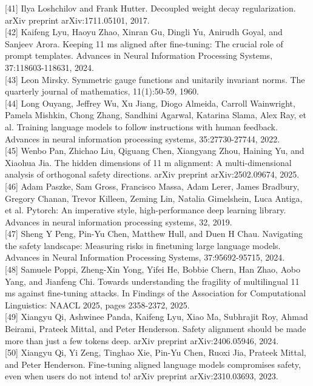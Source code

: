 \documentclass[10pt]{article}
\begin{document}
[41] Ilya Loshchilov and Frank Hutter. Decoupled weight decay regularization. arXiv preprint arXiv:1711.05101, 2017.\\[0pt]
[42] Kaifeng Lyu, Haoyu Zhao, Xinran Gu, Dingli Yu, Anirudh Goyal, and Sanjeev Arora. Keeping 11 ms aligned after fine-tuning: The crucial role of prompt templates. Advances in Neural Information Processing Systems, 37:118603-118631, 2024.\\[0pt]
[43] Leon Mirsky. Symmetric gauge functions and unitarily invariant norms. The quarterly journal of mathematics, 11(1):50-59, 1960.\\[0pt]
[44] Long Ouyang, Jeffrey Wu, Xu Jiang, Diogo Almeida, Carroll Wainwright, Pamela Mishkin, Chong Zhang, Sandhini Agarwal, Katarina Slama, Alex Ray, et al. Training language models to follow instructions with human feedback. Advances in neural information processing systems, 35:27730-27744, 2022.\\[0pt]
[45] Wenbo Pan, Zhichao Liu, Qiguang Chen, Xiangyang Zhou, Haining Yu, and Xiaohua Jia. The hidden dimensions of 11 m alignment: A multi-dimensional analysis of orthogonal safety directions. arXiv preprint arXiv:2502.09674, 2025.\\[0pt]
[46] Adam Paszke, Sam Gross, Francisco Massa, Adam Lerer, James Bradbury, Gregory Chanan, Trevor Killeen, Zeming Lin, Natalia Gimelshein, Luca Antiga, et al. Pytorch: An imperative style, high-performance deep learning library. Advances in neural information processing systems, 32, 2019.\\[0pt]
[47] Sheng Y Peng, Pin-Yu Chen, Matthew Hull, and Duen H Chau. Navigating the safety landscape: Measuring risks in finetuning large language models. Advances in Neural Information Processing Systems, 37:95692-95715, 2024.\\[0pt]
[48] Samuele Poppi, Zheng-Xin Yong, Yifei He, Bobbie Chern, Han Zhao, Aobo Yang, and Jianfeng Chi. Towards understanding the fragility of multilingual 11 ms against fine-tuning attacks. In Findings of the Association for Computational Linguistics: NAACL 2025, pages 2358-2372, 2025.\\[0pt]
[49] Xiangyu Qi, Ashwinee Panda, Kaifeng Lyu, Xiao Ma, Subhrajit Roy, Ahmad Beirami, Prateek Mittal, and Peter Henderson. Safety alignment should be made more than just a few tokens deep. arXiv preprint arXiv:2406.05946, 2024.\\[0pt]
[50] Xiangyu Qi, Yi Zeng, Tinghao Xie, Pin-Yu Chen, Ruoxi Jia, Prateek Mittal, and Peter Henderson. Fine-tuning aligned language models compromises safety, even when users do not intend to! arXiv preprint arXiv:2310.03693, 2023.\\[0pt]
\end{document}

